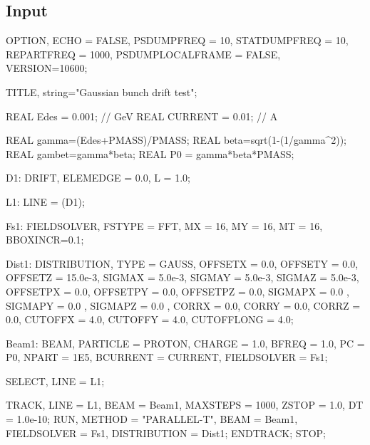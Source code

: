\subsection{\opal Input}
\begin{longexample}
OPTION, ECHO = FALSE, PSDUMPFREQ = 10,
STATDUMPFREQ = 10, REPARTFREQ = 1000,
PSDUMPLOCALFRAME = FALSE, VERSION=10600;

TITLE, string="Gaussian bunch drift test";

REAL Edes    = 0.001;        // GeV
REAL CURRENT = 0.01;  // A

REAL gamma=(Edes+PMASS)/PMASS;
REAL beta=sqrt(1-(1/gamma^2));
REAL gambet=gamma*beta;
REAL P0 = gamma*beta*PMASS;

D1: DRIFT, ELEMEDGE = 0.0, L = 1.0;

L1: LINE = (D1);

Fs1: FIELDSOLVER, FSTYPE = FFT, MX = 16, MY = 16, MT = 16, BBOXINCR=0.1;

Dist1: DISTRIBUTION, TYPE = GAUSS,
       OFFSETX = 0.0, OFFSETY = 0.0, OFFSETZ = 15.0e-3,
       SIGMAX = 5.0e-3, SIGMAY = 5.0e-3, SIGMAZ = 5.0e-3,
       OFFSETPX = 0.0, OFFSETPY = 0.0, OFFSETPZ = 0.0,
       SIGMAPX = 0.0 , SIGMAPY = 0.0 , SIGMAPZ = 0.0 ,
       CORRX = 0.0, CORRY = 0.0, CORRZ = 0.0,
       CUTOFFX = 4.0, CUTOFFY = 4.0, CUTOFFLONG = 4.0;

Beam1: BEAM, PARTICLE = PROTON, CHARGE = 1.0, BFREQ = 1.0, PC = P0,
               NPART = 1E5, BCURRENT = CURRENT, FIELDSOLVER = Fs1;

SELECT, LINE = L1;

TRACK, LINE = L1, BEAM = Beam1, MAXSTEPS = 1000, ZSTOP = 1.0, DT = 1.0e-10;
 RUN, METHOD = "PARALLEL-T", BEAM = Beam1, FIELDSOLVER = Fs1, DISTRIBUTION = Dist1;
ENDTRACK;
STOP;
\end{longexample}

